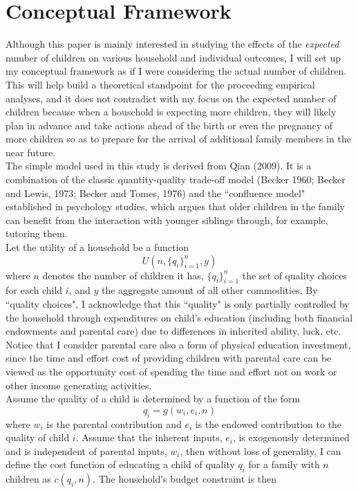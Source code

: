 \documentclass[12pt]{extarticle}
\begin{document}
\section{Conceptual Framework}
Although this paper is mainly interested in studying the effects of the \textit{expected} number of children on various household and individual outcomes, I will set up my conceptual framework as if I were considering the actual number of children. This will help build a theoretical standpoint for the proceeding empirical analyses, and it does not contradict with my focus on the expected number of children because when a household is expecting more children, they will likely plan in advance and take actions ahead of the birth or even the pregnancy of more children so as to prepare for the arrival of additional family members in the near future. \\
\indent The simple model used in this study is derived from Qian (2009). It is a combination of the classic quantity-quality trade-off model (Becker 1960; Becker and Lewis, 1973; Becker and Tomes, 1976) and the ``confluence model" established in psychology studies, which argues that older children in the family can benefit from the interaction with younger siblings through, for example, tutoring them. \\
\indent Let the utility of a household be a function 
$$U(n,\{q_i\}_{i=1}^{n},y)$$
where $n$ denotes the number of children it has, $\{q_i\}_{i=1}^{n}$ the set of quality choices for each child $i$, and $y$ the aggregate amount of all other commodities. By ``quality choices", I acknowledge that this ``quality" is only partially controlled by the household through expenditures on child's education (including both financial endowments and parental care) due to differences in inherited ability, luck, etc. Notice that I consider parental care also a form of physical education investment, since the time and effort cost of providing children with parental care can be viewed as the opportunity cost of spending the time and effort not on work or other income generating activities. \\
\indent Assume the quality of a child is determined by a function of the form 
$$q_i = g(w_i,e_i,n)$$ 
where $w_i$ is the parental contribution and $e_i$ is the endowed contribution to the quality of child $i$. Assume that the inherent inputs, $e_i$, is exogenously determined and is independent of parental inputs, $w_i$, then without loss of generality, I can define the cost function of educating a child of quality $q_i$ for a family with $n$ children as $c(q_i,n)$. The household's budget constraint is then 
\end{document}
